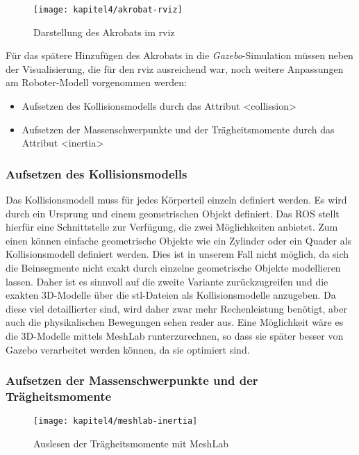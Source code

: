 \begin{figure}[b!]
  \centering
  \texttt{[image: kapitel4/akrobat-rviz]}
  \caption{Darstellung des Akrobats im rviz}
  \label{Kap4:AkrobatRviz}
\end{figure}

Für das spätere Hinzufügen des Akrobats in die \emph{Gazebo}-Simulation müssen neben der Visualisierung, die für den rviz ausreichend war, noch weitere Anpassungen am Roboter-Modell vorgenommen werden:
\begin{itemize}
  \item Aufsetzen des Kollisionsmodells durch das Attribut <collission>
  \item Aufsetzen der Massenschwerpunkte und der Trägheitsmomente durch das Attribut <inertia>
\end{itemize}

\subsubsection{Aufsetzen des Kollisionsmodells}

Das Kollisionsmodell muss für jedes Körperteil einzeln definiert werden. Es wird durch ein Ursprung und einem geometrischen Objekt definiert. Das \ac{ROS} stellt hierfür eine Schnittstelle zur Verfügung, die zwei Möglichkeiten anbietet. Zum einen können einfache geometrische Objekte wie ein Zylinder oder ein Quader als Kollisionsmodell definiert werden. Dies ist in unserem Fall nicht möglich, da sich die Beinsegmente nicht exakt durch einzelne geometrische Objekte modellieren lassen. Daher ist es sinnvoll auf die zweite Variante zurückzugreifen und die exakten 3D-Modelle über die stl-Dateien als Kollisionsmodelle anzugeben. Da diese viel detaillierter sind, wird daher zwar mehr Rechenleistung benötigt, aber auch die physikalischen Bewegungen sehen realer aus. Eine Möglichkeit wäre es die 3D-Modelle mittels MeshLab \autocite{LocalChapterEvents:ItalChap:ItalianChapConf2008:129-136} runterzurechnen, so dass sie später besser von Gazebo verarbeitet werden können, da sie optimiert sind.

\subsubsection{Aufsetzen der Massenschwerpunkte und der Trägheitsmomente}

\begin{figure}[b!]
  \centering
  \texttt{[image: kapitel4/meshlab-inertia]}
  \caption{Auslesen der Trägheitsmomente mit MeshLab}
  \label{Kap4:MeshLabInertia}
\end{figure}

